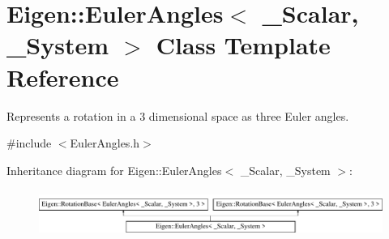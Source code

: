 \hypertarget{class_eigen_1_1_euler_angles}{}\section{Eigen\+:\+:Euler\+Angles$<$ \+\_\+\+Scalar, \+\_\+\+System $>$ Class Template Reference}
\label{class_eigen_1_1_euler_angles}


Represents a rotation in a 3 dimensional space as three Euler angles.  




{\ttfamily \#include $<$Euler\+Angles.\+h$>$}

Inheritance diagram for Eigen\+:\+:Euler\+Angles$<$ \+\_\+\+Scalar, \+\_\+\+System $>$\+:\begin{figure}[H]
\begin{center}
\leavevmode
\includegraphics[height=1.538461cm]{class_eigen_1_1_euler_angles}
\end{center}
\end{figure}
